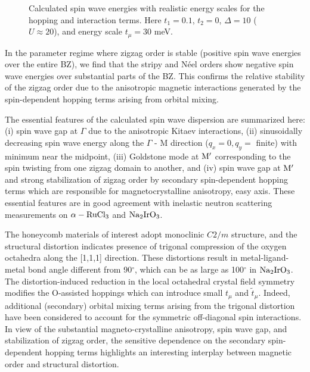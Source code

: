 \documentclass[aps,prb,fleqn,12pt,amsmath,amssymb]{revtex4}
\begin{document}
\begin{figure}
\vspace*{0mm}
\hspace*{0mm}
\caption{Calculated spin wave energies with realistic energy scales for the hopping and interaction terms. Here $t_1 = 0.1$, $t_2 = 0$, $\Delta = 10$ ($U\approx 20$), and energy scale $t_\mu=30$ meV.} 
\label{fig5}
\end{figure}

In the parameter regime where zigzag order is stable (positive spin wave energies over the entire BZ), we find that the stripy and N\'{e}el orders show negative spin wave energies over substantial parts of the BZ. This confirms the relative stability of the zigzag order due to the anisotropic magnetic interactions generated by the spin-dependent hopping terms arising from orbital mixing.

The essential features of the calculated spin wave dispersion are summarized here: (i) spin wave gap at $\Gamma$ due to the anisotropic Kitaev interactions, (ii) sinusoidally decreasing spin wave energy along the $\Gamma$ - M direction ($q_x=0,q_y=$ finite) with minimum near the midpoint, (iii) Goldstone mode at ${\rm M'}$ corresponding to the spin twisting from one zigzag domain to another,  and (iv) spin wave gap at ${\rm M'}$ and strong stabilization of zigzag order by secondary spin-dependent hopping terms which are responsible for magnetocrystalline anisotropy, easy axis. These essential features are in good agreement with inelastic neutron scattering measurements on $\rm \alpha - RuCl_3$ and $\rm Na_2 Ir O_3$. 

The honeycomb materials of interest adopt monoclinic $C2/m$ structure, and the structural distortion indicates presence of trigonal compression of the oxygen octahedra along the [1,1,1] direction. These distortions result in metal-ligand-metal bond angle different from 90$^\circ$, which can be as large as 100$^\circ$ in $\rm Na_2IrO_3$.\cite{ye_PRB_2012} The distortion-induced reduction in the local octahedral crystal field symmetry modifies the O-assisted hoppings which can introduce
small $t_\mu$ and $\tilde{t}_\mu$. Indeed, additional (secondary) orbital mixing terms arising from the trigonal distortion have been considered to account for the symmetric off-diagonal spin interactions.\cite{rau_PRL_2014,winter_JPCM_2017} In view of the substantial magneto-crystalline anisotropy, spin wave gap, and stabilization of zigzag order, the sensitive dependence on the secondary spin-dependent hopping terms highlights an interesting interplay between magnetic order and structural distortion. 
\end{document}
